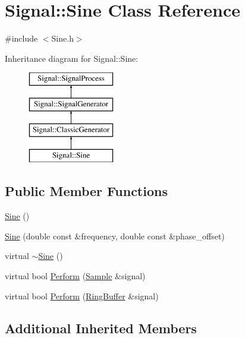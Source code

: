 \hypertarget{class_signal_1_1_sine}{\section{Signal\+:\+:Sine Class Reference}
\label{class_signal_1_1_sine}
}


{\ttfamily \#include $<$Sine.\+h$>$}

Inheritance diagram for Signal\+:\+:Sine\+:\begin{figure}[H]
\begin{center}
\leavevmode
\includegraphics[height=4.000000cm]{class_signal_1_1_sine}
\end{center}
\end{figure}
\subsection*{Public Member Functions}
\begin{DoxyCompactItemize}
\item 
\hyperlink{class_signal_1_1_sine_aa808d1e080ee1c18324eedc020ee0514}{Sine} ()
\item 
\hyperlink{class_signal_1_1_sine_a0dbdf5da8c6baeea56a70f3eb9c3a6fd}{Sine} (double const \&frequency, double const \&phase\+\_\+offset)
\item 
virtual \hyperlink{class_signal_1_1_sine_a0d6a85ad0ddea987aba1955f98be89df}{$\sim$\+Sine} ()
\item 
virtual bool \hyperlink{class_signal_1_1_sine_a8f7c74c35cfd87b490d84a7a75c35691}{Perform} (\hyperlink{class_signal_1_1_sample}{Sample} \&signal)
\item 
virtual bool \hyperlink{class_signal_1_1_sine_ac0a6c6e24f830446ea75de3a392f7e06}{Perform} (\hyperlink{class_signal_1_1_ring_buffer}{Ring\+Buffer} \&signal)
\end{DoxyCompactItemize}
\subsection*{Additional Inherited Members}


